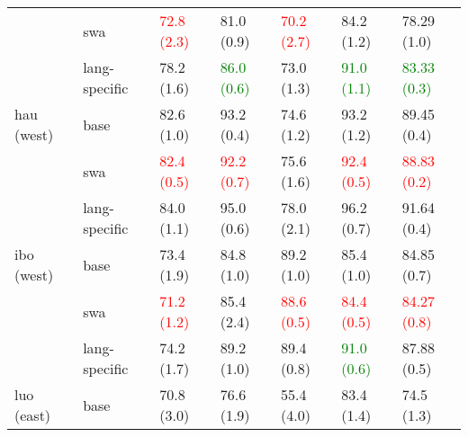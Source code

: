 \begin{tabular}{lllllll}
           & swa &                      \textcolor{red}{72.8 (2.3)} &                      81.0 (0.9) &                      \textcolor{red}{70.2 (2.7)} &                                       84.2 (1.2) &                                       78.29 (1.0) \\
           & lang-specific &                                       78.2 (1.6) &   \textcolor{green}{86.0 (0.6)} &                                       73.0 (1.3) &                    \textcolor{green}{91.0 (1.1)} &                    \textcolor{green}{83.33 (0.3)} \\
\midrule
hau (west) & base &                                       82.6 (1.0) &                      93.2 (0.4) &                                       74.6 (1.2) &                                       93.2 (1.2) &                                       89.45 (0.4) \\
           & swa &                      \textcolor{red}{82.4 (0.5)} &     \textcolor{red}{92.2 (0.7)} &                                       75.6 (1.6) &                      \textcolor{red}{92.4 (0.5)} &                      \textcolor{red}{88.83 (0.2)} \\
           & lang-specific &                                       84.0 (1.1) &                      95.0 (0.6) &                                       78.0 (2.1) &                                       96.2 (0.7) &                                       91.64 (0.4) \\
\midrule
ibo (west) & base &                                       73.4 (1.9) &                      84.8 (1.0) &                                       89.2 (1.0) &                                       85.4 (1.0) &                                       84.85 (0.7) \\
           & swa &                      \textcolor{red}{71.2 (1.2)} &                      85.4 (2.4) &                      \textcolor{red}{88.6 (0.5)} &                      \textcolor{red}{84.4 (0.5)} &                      \textcolor{red}{84.27 (0.8)} \\
           & lang-specific &                                       74.2 (1.7) &                      89.2 (1.0) &                                       89.4 (0.8) &                    \textcolor{green}{91.0 (0.6)} &                                       87.88 (0.5) \\
\midrule
luo (east) & base &                                       70.8 (3.0) &                      76.6 (1.9) &                                       55.4 (4.0) &                                       83.4 (1.4) &                                        74.5 (1.3) \\

\end{tabular}
